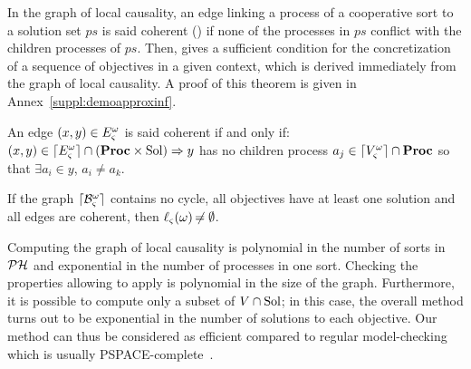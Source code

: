 \begin{comment}
\pref{eq:Vw}, \eqref{eq:Vproc} and \eqref{eq:VE} ensure that all required nodes are in $\cwV$.
Elements in $\PHproc$ are required processes,
elements in $\Obj$ are the objectives to reach these processes
and elements in $\Sol$ are the sets of processes that allow to solve these objectives.
\pref{eq:ESol1} links an objective $P$ to its solutions in $\BS(P)$
and \pref{eq:ESol2} links a solution $ps$ to the processes $a_i \in ps$ it contains.
Then, \pref{eq:EReq} links a required component process $a_i$ to all objectives $\PHobjp{a}{j}{i}$ with $a_j \in \ctx$
while \pref{eq:EPrio} links a required cooperative sort process $a_i$ to its solutions in $\csState(a_i)$.
Finally, if the resolution of an objective $P$ requires a process of $\PHsort(P)$, then \pref{eq:ECont} re-targets this objective ($\gCont$).
\end{comment}

In the graph of local causality, an edge linking a process of a cooperative sort to a solution set $ps$ is said coherent () if none of the processes in $ps$ conflict with the children processes of $ps$.
Then,  gives a sufficient condition for the concretization of a sequence of objectives in a given context,
which is derived immediately from the graph of local causality.
A proof of this theorem is given in Annex~\ref{suppl:demoapproxinf}.
\begin{definition}
\label{def:coherent}
  An edge $(x, y) \in E_\varsigma^\omega$ is said coherent if and only if:
  $(x, y) \in \lceil E_\varsigma^\omega\rceil \cap (\mathbf{Proc} \times \mathrm{Sol}) \Rightarrow y$ has no children process $a_j \in \lceil V_\varsigma^\omega\rceil \cap \mathbf{Proc}$ so that $\exists a_i \in y$, $a_i \neq a_k$.
\end{definition}

\begin{theorem}
\label{th:approxinf}
  If the graph $\lceil \mathcal{B}_\varsigma^\omega\rceil$ contains no cycle,
  all objectives have at least one solution
  and all edges are coherent,
  then $\ell_\varsigma(\omega) \not\nobreak\mkern -2mu = \emptyset$.
\end{theorem}

Computing the graph of local causality is polynomial in the number of sorts in $\mathcal{PH}$ and exponential in the number of processes in one sort.
Checking the properties allowing to apply  is polynomial in the size of the graph.
Furthermore, it is possible to compute only a subset of $V \cap \mathrm{Sol}$;
in this case, the overall method turns out to be exponential in the number of solutions to each objective.
Our method can thus be considered as efficient compared to regular model-checking which is usually PSPACE-complete~\cite{Harel02}.



